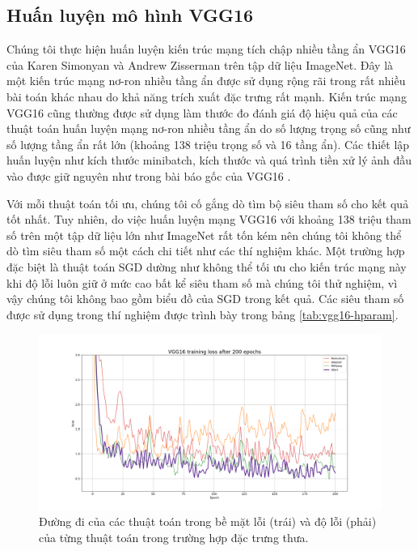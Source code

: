 \subsection{Huấn luyện mô hình VGG16}
\label{exp:vgg16}

Chúng tôi thực hiện huấn luyện kiến trúc mạng tích chập nhiều tầng ẩn VGG16 của Karen Simonyan và Andrew Zisserman \cite{simonyan2014verydeep} trên tập dữ liệu ImageNet. Đây là một kiến trúc mạng nơ-ron nhiều tầng ẩn được sử dụng rộng rãi trong rất nhiều bài toán khác nhau do khả năng trích xuất đặc trưng rất mạnh. Kiến trúc mạng VGG16 cũng thường được sử dụng làm thước đo đánh giá độ hiệu quả của các thuật toán huấn luyện mạng nơ-ron nhiều tầng ẩn \cite{zhuang2020adabelief}\cite{schneider2018deepobs} do số lượng trọng số cũng như số lượng tầng ẩn rất lớn (khoảng 138 triệu trọng số và 16 tầng ẩn). Các thiết lập huấn luyện như kích thước minibatch, kích thước và quá trình tiền xử lý ảnh đầu vào được giữ nguyên như trong bài báo gốc của VGG16 \cite{simonyan2014verydeep}.

Với mỗi thuật toán tối ưu, chúng tôi cố gắng dò tìm bộ siêu tham số cho kết quả tốt nhất. Tuy nhiên, do việc huấn luyện mạng VGG16 với khoảng 138 triệu tham số trên một tập dữ liệu lớn như ImageNet rất tốn kém nên chúng tôi không thể dò tìm siêu tham số một cách chi tiết như các thí nghiệm khác. Một trường hợp đặc biệt là thuật toán SGD dường như không thể tối ưu cho kiến trúc mạng này khi độ lỗi luôn giữ ở mức cao bất kể siêu tham số mà chúng tôi thử nghiệm, vì vậy chúng tôi không bao gồm biểu đồ của SGD trong kết quả. Các siêu tham số được sử dụng trong thí nghiệm được trình bày trong bảng \ref{tab:vgg16-hparam}.

\begin{figure}[htp]
	\centering
	\includegraphics[width=140 mm]{images/vgg16.png}
	\caption{Đường đi của các thuật toán trong bề mặt lỗi (trái) và độ lỗi (phải) của từng thuật toán trong trường hợp đặc trưng thưa.}
	\label{fig:vgg16-loss}
\end{figure}

